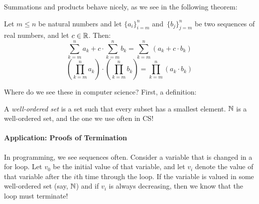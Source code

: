 Summations and products behave nicely, as we see in the following theorem:

\begin{theorem}
    Let $m \leq n$ be natural numbers and
    let $\{a_i\}_{i=m}^n$ and~$\{b_j\}_{j=m}^n$ be two sequences of real
    numbers, and let $c \in {\mathbb R}$.  Then:
    $$\sum_{k=m}^n a_k + c \cdot \sum_{k=m}^n b_k = \sum_{k=m}^n (a_k+ c\cdot b_k)$$
    $$\left( \prod_{k=m}^n a_k \right) \cdot \left(  \prod_{k=m}^n b_k \right)
        = \prod_{k=m}^n \left(a_k \cdot b_k\right)$$
\end{theorem}

Where do we see these in computer science? First, a definition:

\begin{definition}
    A \emph{well-ordered set} is a set such that every subset has a smallest
    element. ${\mathbb N}$ is a well-ordered set, and the one we use often in CS!
\end{definition}

\paragraph{Application: Proofs of Termination}
In programming, we see sequences often.  Consider a variable that is changed in
a for loop.  Let $v_0$ be the initial value of that variable, and let $v_i$
denote the value of that variable after the $i$th time through the loop.
If the variable is valued in some well-ordered set (say, ${\mathbb N}$) and if
$v_i$ is always decreasing, then we know that the loop must terminate!
